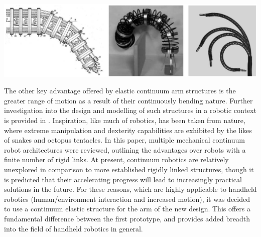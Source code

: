 \documentclass[11pt]{article}
\begin{document}
\begin{center}
\includegraphics[width=\textwidth]{images/robotVariation.png}
\label{figure:robotVariation}
\end{center}


The other key advantage offered by elastic continuum arm structures is the greater range of motion as a result of their continuously bending nature. Further investigation into the design and modelling of such structures in a robotic context is provided in \cite{webster2010}. Inspiration, like much of robotics, has been taken from nature, where extreme manipulation and dexterity capabilities are exhibited by the likes of snakes and octopus tentacles. In this paper, multiple mechanical continuum robot architectures were reviewed, outlining the advantages over robots with a finite number of rigid links. At present, continuum robotics are relatively unexplored in comparison to more established rigidly linked structures, though it is predicted that their accelerating progress will lead to increasingly practical solutions in the future. For these reasons, which are highly applicable to handheld robotics (human/environment interaction and increased motion), it was decided to use a continuum elastic structure for the arm of the new design. This offers a fundamental difference between the first prototype, and provides added breadth into the field of handheld robotics in general.
\end{document}
